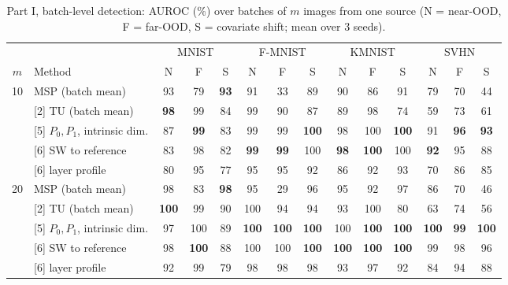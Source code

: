 \begin{table}[t]
\centering
\setlength{\tabcolsep}{2.5pt}\scriptsize
\begin{tabular}{@{}clcccccccccccc@{}}
\toprule
 & & \multicolumn{3}{c}{MNIST} & \multicolumn{3}{c}{F-MNIST} & \multicolumn{3}{c}{KMNIST} & \multicolumn{3}{c}{SVHN} \\
\cmidrule(lr){3-5}\cmidrule(lr){6-8}\cmidrule(lr){9-11}\cmidrule(lr){12-14}
$m$ & Method & N & F & S & N & F & S & N & F & S & N & F & S \\
\midrule
\multirow{5}{*}{10} & {MSP (batch mean)} & 93 & 79 & \textbf{93} & 91 & 33 & 89 & 90 & 86 & 91 & 79 & 70 & 44 \\
 & {[2] TU (batch mean)} & \textbf{98} & 99 & 84 & 99 & 90 & 87 & 89 & 98 & 74 & 59 & 73 & 61 \\
 & {[5] $P_0,P_1$, intrinsic dim.} & 87 & \textbf{99} & 83 & 99 & 99 & \textbf{100} & 98 & 100 & \textbf{100} & 91 & \textbf{96} & \textbf{93} \\
 & {[6] SW to reference} & 83 & 98 & 82 & \textbf{99} & \textbf{99} & 100 & \textbf{98} & \textbf{100} & 100 & \textbf{92} & 95 & 88 \\
 & {[6] layer profile} & 80 & 95 & 77 & 95 & 95 & 92 & 86 & 92 & 93 & 70 & 86 & 85 \\
\midrule
\multirow{5}{*}{20} & {MSP (batch mean)} & 98 & 83 & \textbf{98} & 95 & 29 & 96 & 95 & 92 & 97 & 86 & 70 & 46 \\
 & {[2] TU (batch mean)} & \textbf{100} & 99 & 90 & 100 & 94 & 94 & 93 & 100 & 80 & 63 & 74 & 56 \\
 & {[5] $P_0,P_1$, intrinsic dim.} & 97 & 100 & 89 & \textbf{100} & \textbf{100} & \textbf{100} & 100 & \textbf{100} & \textbf{100} & \textbf{100} & \textbf{99} & \textbf{100} \\
 & {[6] SW to reference} & 98 & \textbf{100} & 88 & 100 & 100 & \textbf{100} & \textbf{100} & \textbf{100} & \textbf{100} & 99 & 98 & 96 \\
 & {[6] layer profile} & 92 & 99 & 79 & 98 & 98 & 98 & 93 & 97 & 92 & 84 & 94 & 88 \\
\bottomrule
\end{tabular}
\caption{Part I, batch-level detection: AUROC (\%) over batches of $m$ images from one source (N = near-OOD, F = far-OOD, S = covariate shift; mean over 3 seeds).}
\label{tab:p1-batch}
\end{table}
